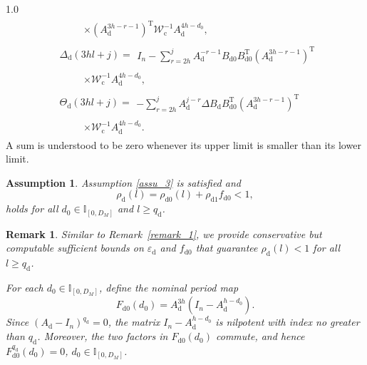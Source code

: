 \documentclass[journal]{IEEEtran}
\newtheorem{assumption}{Assumption}
\newtheorem{remark}{Remark}
\begin{document}
\begin{spacing}{1.0}
\begin{align}
%
&\qquad
\begin{array}{ll}
\times
(A_{\mathrm{d}}^{3h-r-1})^{\mathrm{T}}
\mathcal{W}_{\mathrm{c}}^{-1}
A_{\mathrm{d}}^{4h-d_{0}},
\end{array}
\label{F_d_def}\\
%
&\mathit{\Delta}_{\mathrm{d}}(3hl+j)=
\begin{array}{ll}
I_{n}
-
\textstyle\sum_{r=2h}^{j}
A_{\mathrm{d}}^{-r-1}B_{\mathrm{d}0}
B_{\mathrm{d}0}^{\mathrm{T}}
(A_{\mathrm{d}}^{3h-r-1})^{\mathrm{T}}
\end{array}\nonumber\\
%
&\qquad
\begin{array}{ll}
\times
\mathcal{W}_{\mathrm{c}}^{-1}
A_{\mathrm{d}}^{4h-d_{0}},
\end{array}
\label{delta_ds}\\
%
&\mathit{\Theta}_{\mathrm{d}}(3hl+j)=
\begin{array}{ll}
-\textstyle\sum_{r=2h}^{j}
A_{\mathrm{d}}^{j-r}\mathit{\Delta}B_{\mathrm{d}}
B_{\mathrm{d}0}^{\mathrm{T}}
(A_{\mathrm{d}}^{3h-r-1})^{\mathrm{T}}
\end{array}\nonumber\\
%
&\qquad
\begin{array}{ll}
\times
\mathcal{W}_{\mathrm{c}}^{-1}
A_{\mathrm{d}}^{4h-d_{0}}.
\end{array}
\label{ceta_ds}
\end{align}
A sum is understood to be zero whenever its upper limit is smaller than
its lower limit.
\begin{assumption}
\label{ass4} Assumption \ref{assu_3} is satisfied and
\[
\rho_{\mathrm{d}}(l)  =\rho_{\mathrm{d}0}(l)  +\rho_{\mathrm{d}1}f_{\mathrm{d}0}<1,
\] holds for all $d_{0}\in\mathbb{I}_{[0,D_{M}]}$ and $l\geq q_{\mathrm{d}}$.
\end{assumption}

\begin{remark}
Similar to Remark~\ref{remark_1}, we provide conservative but
computable sufficient bounds on $\varepsilon_{\mathrm d}$ and
$f_{\mathrm d0}$ that guarantee $\rho_{\mathrm d}(l)<1$ for all
$l\geq q_{\mathrm d}$.

For each $d_{0}\in\mathbb{I}_{[0,D_{M}]}$, define the nominal
period map
\[
F_{\mathrm d0}(d_{0})
=
A_{\mathrm d}^{3h}
\left(
I_{n}-A_{\mathrm d}^{h-d_{0}}
\right).
\]
Since
$(A_{\mathrm d}-I_{n})^{q_{\mathrm d}}=0$, the matrix
$I_{n}-A_{\mathrm d}^{h-d_{0}}$ is nilpotent with index no
greater than $q_{\mathrm d}$. Moreover, the two factors in
$F_{\mathrm d0}(d_{0})$ commute, and hence
$F_{\mathrm d0}^{q_{\mathrm d}}(d_{0})=0$, $d_{0}\in\mathbb{I}_{[0,D_{M}]}$.



\end{remark}
\end{spacing}
\end{document}
